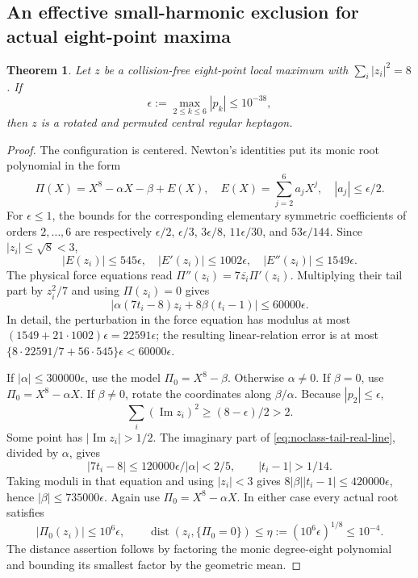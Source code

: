 \documentclass[11pt]{article}
\newtheorem{theorem}{Theorem}[section]
\theoremstyle{remark}
\numberwithin{equation}{section}
\begin{document}
\subsection{An effective small-harmonic exclusion for actual eight-point maxima}
\begin{theorem}\label{thm:noclass-n8-small-harmonic}
Let $z$ be a collision-free eight-point local maximum with
$\sum_i|z_i|^2=8$. If
\[
 \epsilon:=\max_{2\le k\le6}|p_k|\le10^{-38},
\]
then $z$ is a rotated and permuted central regular heptagon.
\end{theorem}
\begin{proof}
The configuration is centered. Newton's identities put its monic
root polynomial in the form
\[
 \Pi(X)=X^8-\alpha X-\beta+E(X),\quad
 E(X)=\sum_{j=2}^6a_jX^j,\quad |a_j|\le\epsilon/2.
\]
For $\epsilon\le1$, the bounds for the corresponding elementary
symmetric coefficients of orders $2,\ldots,6$ are respectively
$\epsilon/2$, $\epsilon/3$, $3\epsilon/8$, $11\epsilon/30$,
and $53\epsilon/144$. Since $|z_i|\le\sqrt8<3$,
\[
 |E(z_i)|\le545\epsilon,\quad |E'(z_i)|\le1002\epsilon,
 \quad |E''(z_i)|\le1549\epsilon.
\]
The physical force equations read
$\Pi''(z_i)=7\overline{z_i}\Pi'(z_i)$. Multiplying their tail
part by $z_i^2/7$ and using $\Pi(z_i)=0$ gives
\begin{equation}\label{eq:noclass-tail-real-line}
 |\alpha(7t_i-8)z_i+8\beta(t_i-1)|\le60000\epsilon.
\end{equation}
In detail, the perturbation in the force equation has modulus at
most $(1549+21\cdot1002)\epsilon=22591\epsilon$; the resulting
linear-relation error is at most
$\{8\cdot22591/7+56\cdot545\}\epsilon<60000\epsilon$.

If $|\alpha|\le300000\epsilon$, use the model $\Pi_0=X^8-\beta$.
Otherwise $\alpha\ne0$. If $\beta=0$, use $\Pi_0=X^8-\alpha X$.
If $\beta\ne0$, rotate the coordinates along $\beta/\alpha$.
Because $|p_2|\le\epsilon$,
\[
 \sum_i(\operatorname{Im}z_i)^2\ge(8-\epsilon)/2>2.
\]
Some point has $|\operatorname{Im}z_i|>1/2$. The imaginary part
of \eqref{eq:noclass-tail-real-line}, divided by $\alpha$, gives
\[
 |7t_i-8|\le120000\epsilon/|\alpha|<2/5,
 \qquad |t_i-1|>1/14.
\]
Taking moduli in that equation and using $|z_i|<3$ gives
$8|\beta||t_i-1|\le420000\epsilon$, hence
$|\beta|\le735000\epsilon$. Again use $\Pi_0=X^8-\alpha X$.
In either case every actual root satisfies
\[
 |\Pi_0(z_i)|\le10^6\epsilon,
 \qquad \operatorname{dist}(z_i,\{\Pi_0=0\})
       \le\eta:=(10^6\epsilon)^{1/8}\le10^{-4}.
\]
The distance assertion follows by factoring the monic degree-eight
polynomial and bounding its smallest factor by the geometric mean.


\end{proof}
\end{document}
